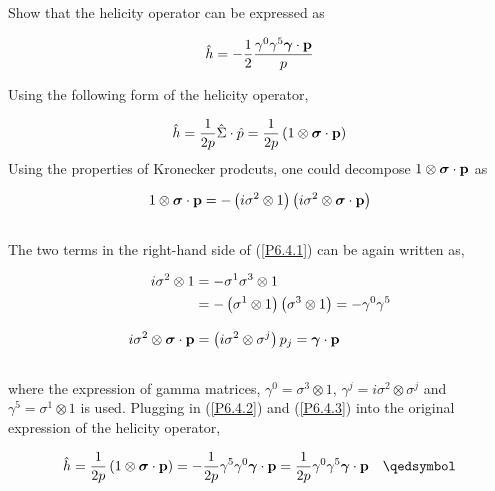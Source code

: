 \begin{problem}{6.4}
    Show that the helicity operator can be expressed as

    \begin{align*}
        \hat{h} = - \frac{1}{2} \frac{\gamma^0\gamma^5\boldsymbol{\gamma}\cdot\mathbf{p}}{p}\\
    \end{align*}
\end{problem}
\begin{solution}
Using the following form of the helicity operator, 

\begin{align*}
    \hat{h} = \frac{1}{2p} \hat{\Sigma} \cdot \hat{p} = \frac{1}{2p} \left(1\otimes \boldsymbol{\sigma}\cdot\mathbf{p}\right)\\
\end{align*}
Using the properties of Kronecker prodcuts, one could decompose $1\otimes \boldsymbol{\sigma}\cdot\mathbf{p}$ as 

\begin{align} \label{P6.4.1}
    1\otimes \boldsymbol{\sigma}\cdot\mathbf{p} = - \left(i\sigma^2 \otimes 1 \right)  \left(i\sigma^2 \otimes  \boldsymbol{\sigma}\cdot\mathbf{p}  \right)  \\ \nonumber
\end{align}
The two terms in the right-hand side of (\ref{P6.4.1}) can be again written as, 

\begin{align}
     i\sigma^2 \otimes 1 &= -\sigma^1\sigma^3 \otimes 1 \nonumber \\  \label{P6.4.2}
                         &= -\left(\sigma^1\otimes 1\right)  \left(\sigma^3\otimes 1\right) = -\gamma^0 \gamma^5  \\[0.12in]  \label{P6.4.3}
    i\sigma^2 \otimes  \boldsymbol{\sigma}\cdot\mathbf{p} &=  \left(i\sigma^2 \otimes \sigma^j\right)p_j = \boldsymbol{\gamma} \cdot \mathbf{p} \\ \nonumber
\end{align}
where the expression of gamma matrices, $\gamma^0 = \sigma^3 \otimes 1$, $\gamma^j=i\sigma^2\otimes\sigma^j$ and $\gamma^5=\sigma^1\otimes 1$ is used. Plugging in (\ref{P6.4.2}) and (\ref{P6.4.3}) into the original expression of the helicity operator,

\begin{align*}
    \hat{h} =  \frac{1}{2p} \left(1\otimes \boldsymbol{\sigma}\cdot\boldp\right) = -\frac{1}{2p} \gamma^5 \gamma^0 \boldsymbol{\gamma} \cdot \boldp  =  \frac{1}{2p} \gamma^0 \gamma^5 \boldsymbol{\gamma} \cdot \boldp  \qed \\
\end{align*}
\end{solution}

